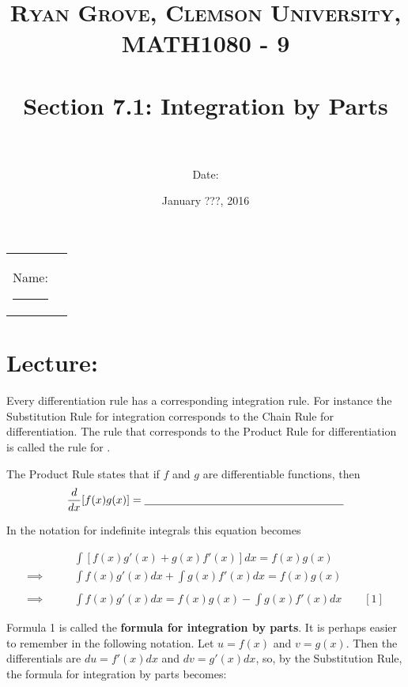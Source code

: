 \documentclass[paper=a4, fontsize=11pt]{scrartcl} %
\title{	
\normalfont \normalsize 
\textsc{Ryan Grove, Clemson University, MATH1080 - 9} \\ [25pt] %
\horrule{0.5pt} \\[0.4cm] %
\huge Section 7.1: Integration by Parts \\ %
\horrule{2pt} \\[0.5cm] %
}
\author{Date:} %
\date{\normalsize January ???, 2016} %
\numberwithin{equation}{section} %
\numberwithin{figure}{section} %
\numberwithin{table}{section} %
\newcommand{\ds}{\displaystyle}
\begin{document}
\maketitle %

\begin{flushleft}
\begin{tabular}{l l}
Name: \rule{3.2in}{.01cm}  & {}%
\end{tabular}
\end{flushleft}


\section*{\textbf{Lecture:}}

Every differentiation rule has a corresponding integration rule. For instance the Substitution Rule for integration corresponds to the Chain Rule for differentiation. The rule that corresponds to the Product Rule for differentiation is called the rule for \underline{\hspace{1.25in}} \underline{\hspace{0.4in}} \underline{\hspace{0.8in}}.\\
\indent

The Product Rule states that if $f$ and $g$ are differentiable functions, then\\

\[\ds\frac{d}{dx}[f(x)g(x)] = \underline{\hspace{2.5in}}\]
\indent

In the notation for indefinite integrals this equation becomes

\begin{align*}
&\ds\int [f(x)g'(x) + g(x)f'(x)]dx = f(x)g(x)\\
\implies \quad \quad &\ds\int f(x)g'(x)dx + \ds\int g(x)f'(x)dx = f(x)g(x)\\
\text{ } &\\
\implies \quad \quad &\boxed{\ds\int f(x)g'(x)dx = f(x)g(x) - \ds\int g(x)f'(x)dx} \quad \quad [1]
\end{align*}

Formula 1 is called the \textbf{formula for integration by parts}. It is perhaps easier to remember in the following notation. Let $u=f(x)$ and $v=g(x)$. Then the differentials are $du=f'(x)dx$ and $dv=g'(x)dx$, so, by the Substitution Rule, the formula for integration by parts becomes:
\end{document}
